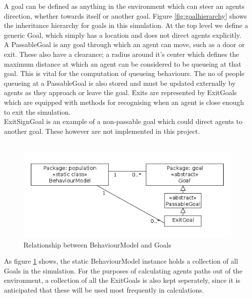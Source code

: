 A goal can be defined as anything in the environment which can steer an agents direction, whether towards itself or another goal. Figure \ref{fig:goalhierarchy} shows the inheritance hierarchy for goals in this simulation. At the top level we define a generic Goal, which simply has a location and does not direct agents explicitly.
\\
A PassableGoal is any goal through which an agent can move, such as a door or exit. These also have a clearance; a radius around it's center which defines the maximum distance at which an agent can be considered to be queueing at that goal. This is vital for the computation of queueing behaviours. The no of people queueing at a PassableGoal is also stored and must be updated externally by agents as they approach or leave the goal.
Exits are represented by ExitGoals which are equipped with methods for recognising when an agent is close enough to exit the simulation.
\\
ExitSignGoal is an example of a non-passable goal which could direct agents to another goal. These however are not implemented in this project.
\\
\\
\begin{figure}[here]
\centering
\includegraphics[scale=0.7]{../UMLDiagrams/BehaviourModelToGoalModel.png}
\caption{Relationship between BehaviourModel and Goals}
\label{fig:behaviourtogoalmodel}
\end{figure}

As figure \ref{fig:behaviourtogoalmodel} shows, the static BehaviourModel instance holds a collection of all Goals in the simulation. For the purposes of calculating agents paths out of the environment, a collection of all the ExitGoals is also kept seperately, since it is anticipated that these will be used most frequently in calculations.\\

%

